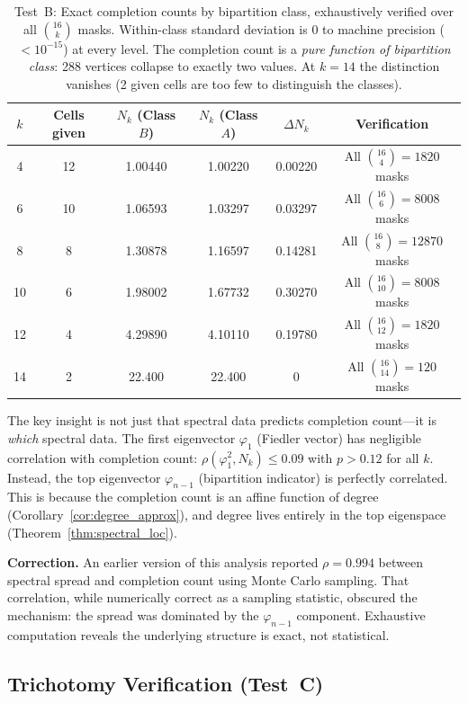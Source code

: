 \documentclass[11pt]{article}
\theoremstyle{definition}
\theoremstyle{remark}
\begin{document}
\begin{table}[h]
\centering
\begin{tabular}{cccccc}
\toprule
$k$ & Cells given & $N_k$ (Class $B$) & $N_k$ (Class $A$) & $\Delta N_k$ & Verification \\
\midrule
4  & 12 & 1.00440 & 1.00220 & 0.00220 & All $\binom{16}{4} = 1820$ masks \\
6  & 10 & 1.06593 & 1.03297 & 0.03297 & All $\binom{16}{6} = 8008$ masks \\
8  & 8 & 1.30878 & 1.16597 & 0.14281 & All $\binom{16}{8} = 12870$ masks \\
10 & 6 & 1.98002 & 1.67732 & 0.30270 & All $\binom{16}{10} = 8008$ masks \\
12 & 4 & 4.29890 & 4.10110 & 0.19780 & All $\binom{16}{12} = 1820$ masks \\
14 & 2 & 22.400 & 22.400 & 0 & All $\binom{16}{14} = 120$ masks \\
\bottomrule
\end{tabular}
\caption{Test~B: Exact completion counts by bipartition class, exhaustively verified over all $\binom{16}{k}$ masks. Within-class standard deviation is $0$ to machine precision ($< 10^{-15}$) at every level. The completion count is a \emph{pure function of bipartition class}: 288 vertices collapse to exactly two values. At $k = 14$ the distinction vanishes (2 given cells are too few to distinguish the classes).}
\label{tab:testB}
\end{table}

The key insight is not just that spectral data predicts completion count---it is \emph{which} spectral data. The first eigenvector $\varphi_1$ (Fiedler vector) has negligible correlation with completion count: $\rho(\varphi_1^2, N_k) \le 0.09$ with $p > 0.12$ for all $k$. Instead, the top eigenvector $\varphi_{n-1}$ (bipartition indicator) is perfectly correlated. This is because the completion count is an affine function of degree (Corollary~\ref{cor:degree_approx}), and degree lives entirely in the top eigenspace (Theorem~\ref{thm:spectral_loc}).

\textbf{Correction.} An earlier version of this analysis reported $\rho = 0.994$ between spectral spread and completion count using Monte Carlo sampling. That correlation, while numerically correct as a sampling statistic, obscured the mechanism: the spread was dominated by the $\varphi_{n-1}$ component. Exhaustive computation reveals the underlying structure is exact, not statistical.


\subsection{Trichotomy Verification (Test~C)}
\end{document}
